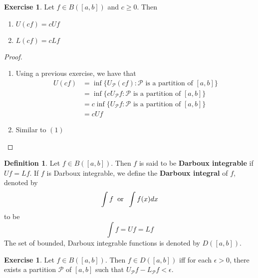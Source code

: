 \documentclass{book}
\theoremstyle{definition}
\newtheorem{defn}[definition]{Definition}
\newtheorem{ex}[definition]{Exercise}
\newcommand{\ep}{\epsilon}
\newcommand{\MP}{\mathcal{P}}
\newcommand{\lex}[1]{\label{ex:#1}}
\newcommand{\ld}[1]{\label{defn:#1}}
\DeclareMathOperator*{\0}{\mbf{0}}
\DeclareMathOperator*{\1}{\mbf{1}}
\begin{document}
	\begin{ex} \lex{00000} 
		Let $f \in B([a,b])$ and $c \geq 0$. Then 
		\begin{enumerate}
			\item $U (cf) = c U f$ 
			\item $L (cf) = c L f $
		\end{enumerate}
	\end{ex}
	
	\begin{proof}\
		\begin{enumerate}
			\item Using a previous exercise, we have that
			\begin{align*}
				U(cf) 
				&= \inf \{U_\MP (cf): \MP \text{ is a partition of } [a,b]\} \\
				&= \inf \{c U_\MP f: \MP \text{ is a partition of } [a,b]\} \\
				&= c \inf \{U_\MP f: \MP \text{ is a partition of } [a,b]\} \\
				&= c Uf
			\end{align*}
			\item Similar to $(1)$
		\end{enumerate}
	\end{proof}

	\begin{defn} \ld{00000} 
		Let $f \in B([a,b])$. Then $f$ is said to be \textbf{Darboux integrable} if $Uf = Lf$. If $f$ is Darboux integrable, we define the \textbf{Darboux integral} of $f$, denoted by $$\int f \hspace{.2cm} \text{or} \hspace{.2cm} \int f(x) dx$$ to be $$\int f = Uf = Lf$$ The set of bounded, Darboux integrable functions is denoted by $D([a,b])$.
	\end{defn}

	\begin{ex} \lex{00000} 
		Let $f \in B([a,b])$. Then $f \in D([a,b])$ iff for each $\ep >0$, there exists a partition $\MP$ of $[a,b]$ such that $U_\MP f - L_\MP f < \ep$.
	\end{ex}
\end{document}
